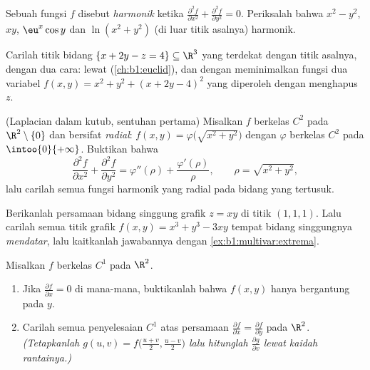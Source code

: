 \begin{exercise}[$\star\star$]\label{exo:b1:multivar:7}
Sebuah fungsi $f$ disebut \emph{harmonik} ketika $\frac{\partial^2 f}{\partial
x^2} + \frac{\partial^2 f}{\partial y^2} = 0$. Periksalah bahwa $x^2 -
y^2$, $xy$, $\eu^x\cos y$ dan $\ln(x^2 + y^2)$ (di luar titik asalnya)
harmonik.
\end{exercise}

\begin{exercise}[$\star\star\star$]\label{exo:b1:multivar:8}
Carilah titik bidang $\{x + 2y - z = 4\} \subseteq \R^3$
yang terdekat dengan titik asalnya, dengan dua cara: lewat 
(\cref{ch:b1:euclid}), dan dengan meminimalkan fungsi dua variabel
$f(x, y) = x^2 + y^2 + (x + 2y - 4)^2$ yang diperoleh dengan menghapus $z$.
\end{exercise}

\begin{exercise}[$\star\star\star$]\label{exo:b1:multivar:9}
(Laplacian dalam  kutub, sentuhan pertama) Misalkan $f$ berkelas $C^2$ pada
$\R^2 \setminus \{0\}$ dan bersifat \emph{radial}: $f(x, y) =
\varphi\bigl(\sqrt{x^2+y^2}\bigr)$ dengan $\varphi$ berkelas $C^2$ pada
$\intoo{0}{+\infty}$. Buktikan bahwa
\[
\frac{\partial^2 f}{\partial x^2} + \frac{\partial^2 f}{\partial
y^2} = \varphi''(\rho) + \frac{\varphi'(\rho)}{\rho},
\qquad \rho = \sqrt{x^2 + y^2},
\]
lalu carilah semua fungsi harmonik yang radial pada bidang yang tertusuk.
\end{exercise}

\begin{exercise}[$\star\star$]\label{exo:b1:multivar:10}
Berikanlah persamaan bidang singgung grafik $z = xy$ di
titik $(1, 1, 1)$. Lalu carilah semua titik grafik
$f(x,y) = x^3 + y^3 - 3xy$ tempat bidang singgungnya
\emph{mendatar}, lalu kaitkanlah jawabannya dengan
\cref{ex:b1:multivar:extrema}.
\end{exercise}

\begin{exercise}[$\star\star$]\label{exo:b1:multivar:11}
Misalkan $f$ berkelas $C^1$ pada $\R^2$.
\begin{enumerate}
  \item Jika $\frac{\partial f}{\partial x} = 0$ di mana-mana, buktikanlah
        bahwa $f(x, y)$ hanya bergantung pada $y$.
  \item Carilah semua penyelesaian $C^1$ atas persamaan
        $\frac{\partial f}{\partial x} = \frac{\partial
        f}{\partial y}$ pada $\R^2$. \emph{(Tetapkanlah $g(u, v) =
        f\bigl(\frac{u+v}2, \frac{u-v}2\bigr)$ lalu hitunglah
        $\frac{\partial g}{\partial v}$ lewat kaidah rantainya.)}
\end{enumerate}
\end{exercise}

